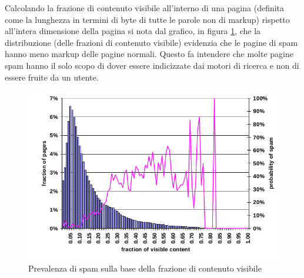 Calcolando la frazione di contenuto visibile all'interno di una pagina (definita come la lunghezza in termini di byte di tutte le parole non di markup) rispetto all'intera dimensione della pagina si nota dal grafico, in figura \ref{fig:fetterly7}, che la distribuzione (delle frazioni di contenuto visibile) evidenzia che le pagine di spam hanno meno markup delle pagine normali. Questo fa intendere che molte pagine spam hanno il solo scopo di dover essere indicizzate dai motori di ricerca  e non di essere fruite da un utente.
\begin{figure}[htbp]
\centering
\includegraphics[width=12cm]{immagini/fetterly/fetterly7}
\caption{Prevalenza di spam sulla base della frazione di contenuto visibile}
\label{fig:fetterly7}
\end{figure}

